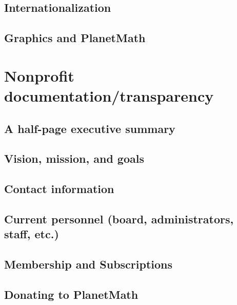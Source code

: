 \documentclass[12pt,report]{memoir}
\begin{document}
\section{Internationalization}


\section{Graphics and PlanetMath}



\chapter{Nonprofit documentation/transparency}


\section{A half-page executive summary}


\section{Vision, mission, and goals}


\section{Contact information}


\section{Current personnel (board, administrators, staff, etc.)}


\section{Membership and Subscriptions}


\section{Donating to PlanetMath}

\end{document}

